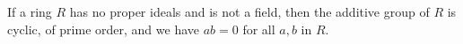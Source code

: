 If a ring $R$ has no proper ideals and is not a field, then the additive group of $R$ is cyclic, of prime order, and we have $ab = 0$ for all $a, b$ in $R$.
